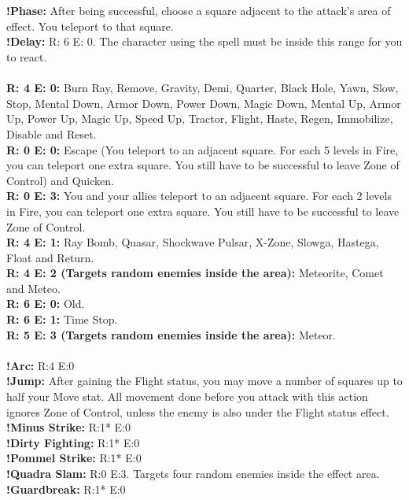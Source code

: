 %
\\\\
%
 \ofrow
\textbf{!Phase:} After being successful, choose a square adjacent to the attack’s area of effect. You teleport to that square.\\
\textbf{!Delay:} R: 6 E: 0. The character using the spell must be inside this range for you to react.
%
\\\\
%
 \ofrow
\textbf{R: 4 E: 0:} Burn Ray, Remove, Gravity, Demi, Quarter, Black Hole, Yawn, Slow, Stop, Mental Down, Armor Down, Power Down, Magic Down, Mental Up, Armor Up, Power Up, Magic Up, Speed Up, Tractor, Flight, Haste, Regen, Immobilize, Disable and Reset.\\
\textbf{R: 0 E: 0:} Escape (You teleport to an adjacent square. For each 5 levels in Fire, you can teleport one extra square. You still have to be successful to leave Zone of Control) and Quicken.\\
\textbf{R: 0 E: 3:} You and your allies teleport to an adjacent square. For each 2 levels in Fire, you can teleport one extra square. You still have to be successful to leave Zone of Control.\\
\textbf{R: 4 E: 1:} Ray Bomb, Quasar, Shockwave Pulsar, X-Zone, Slowga, Hastega, Float and Return.\\
\textbf{R: 4 E: 2 (Targets random enemies inside the area):} Meteorite, Comet and Meteo.\\
\textbf{R: 6 E: 0:} Old.\\
\textbf{R: 6 E: 1:} Time Stop.\\
\textbf{R: 5 E: 3 (Targets random enemies inside the area):} Meteor.
%
\\\\
%
 \ofrow
\textbf{!Arc:} R:4 E:0\\
\textbf{!Jump:} After gaining the Flight status, you may move a number of squares up to half your Move stat. All movement done before you attack with this action ignores Zone of Control, unless the enemy is also under the Flight status effect.\\
\textbf{!Minus Strike:} R:1* E:0\\
\textbf{!Dirty Fighting:} R:1* E:0\\
\textbf{!Pommel Strike:} R:1* E:0\\
\textbf{!Quadra Slam:} R:0 E:3. Targets four random enemies inside the effect area.\\
\textbf{!Guardbreak:} R:1* E:0\\
